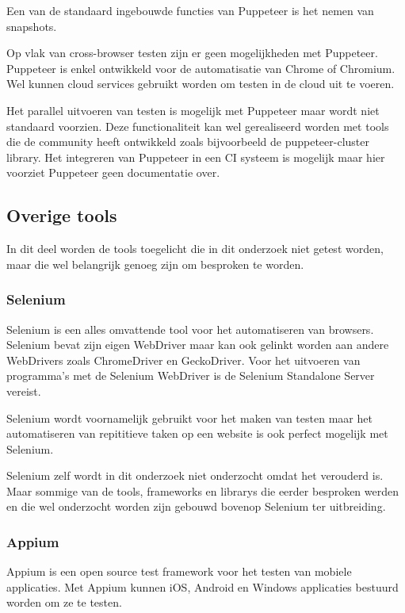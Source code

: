 Een van de standaard ingebouwde functies van Puppeteer is het nemen van \glspl{snapshot}.

Op vlak van cross-browser testen zijn er geen mogelijkheden met Puppeteer. Puppeteer is enkel ontwikkeld voor de automatisatie van Chrome of Chromium. Wel kunnen cloud services gebruikt worden om testen in de cloud uit te voeren.

Het parallel uitvoeren van testen is mogelijk met Puppeteer maar wordt niet standaard voorzien. Deze functionaliteit kan wel gerealiseerd worden met \glspl{tool} die de community heeft ontwikkeld zoals bijvoorbeeld de puppeteer-cluster \gls{library}. Het integreren van Puppeteer in een \gls{CI} systeem is mogelijk maar hier voorziet Puppeteer geen documentatie over.

\subsection{Overige tools}
In dit deel worden de \glspl{tool} toegelicht die in dit onderzoek niet getest worden, maar die wel belangrijk genoeg zijn om besproken te worden.

\subsubsection{Selenium}
Selenium is een alles omvattende \gls{tool} voor het automatiseren van browsers. Selenium bevat zijn eigen \gls{WebDriver} maar kan ook gelinkt worden aan andere \glspl{WebDriver} zoals ChromeDriver en GeckoDriver. Voor het uitvoeren van programma's met de Selenium \gls{WebDriver} is de Selenium Standalone Server vereist.

Selenium wordt voornamelijk gebruikt voor het maken van testen maar het automatiseren van repititieve taken op een website is ook perfect mogelijk met Selenium.

Selenium zelf wordt in dit onderzoek niet onderzocht omdat het verouderd is. Maar sommige van de \glspl{tool}, \glspl{framework} en \glspl{library} die eerder besproken werden en die wel onderzocht worden zijn gebouwd bovenop Selenium ter uitbreiding.

\subsubsection{Appium}
Appium is een open source test \gls{framework} voor het testen van mobiele applicaties. Met Appium kunnen  iOS, Android en Windows applicaties bestuurd worden om ze te testen.


